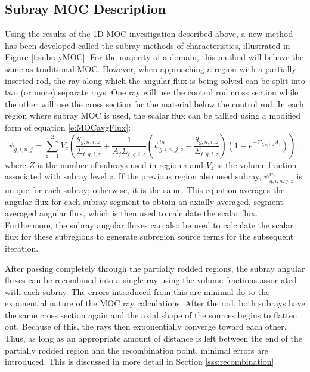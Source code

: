 \subsection{Subray MOC Description}

Using the results of the 1D MOC investigation described above, a new method has been developed called the subray methods of characteristics, illustrated in Figure \ref{f:subrayMOC}.  For the majority of a domain, this method will behave the same as traditional MOC.  However, when approaching a region with a partially inserted rod, the ray along which the angular flux is being solved can be split into two (or more) separate rays.  One ray will use the control rod cross section while the other will use the cross section for the material below the control rod.  In each region where subray MOC is used, the scalar flux can be tallied using a modified form of equation \ref{e:MOCavgFlux}:
\begin{equation}
\overline{\psi}_{g,i,n,j} = \sum_{z=1}^Z V_z \left(\frac{q_{g,n,i,z}}{\Sigma_{t,g,i,z}} + \frac{1}{A_j\Sigma_{t,g,i,z}}\left(\psi^{in}_{g,i,n,j,z} - \frac{q_{g,n,i,z}}{\Sigma_{t,g,i,z}}\right)\left(1 - e^{-\Sigma_{t,g,i,z} A_j}\right)\right)\ ,
\end{equation}
where $Z$ is the number of subrays used in region $i$ and $V_z$ is the volume fraction associated with subray level $z$.  If the previous region also used subray, $\psi^{in}_{g,i,n,j,z}$ is unique for each subray; otherwise, it is the same.  This equation averages the angular flux for each subray segment to obtain an axially-averaged, segment-averaged angular flux, which is then used to calculate the scalar flux.  Furthermore, the subray angular fluxes can also be used to calculate the scalar flux for these subregions to generate subregion source terms for the subsequent iteration.

After passing completely through the partially rodded regions, the subray angular fluxes can be recombined into a single ray using the volume fractions associated with each subray.  The errors introduced from this are minimal do to the exponential nature of the MOC ray calculations.  After the rod, both subrays have the same cross section again and the axial shape of the sources begins to flatten out.  Because of this, the rays then exponentially converge toward each other.  Thus, as long as an appropriate amount of distance is left between the end of the partially rodded region and the recombination point, minimal errors are introduced.  This is discussed in more detail in Section \ref{sss:recombination}.

